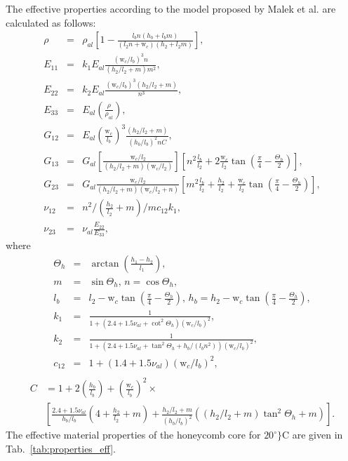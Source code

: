 The effective properties according to the model proposed by Malek et al. \cite{malek2015effective} are calculated as follows:
\begin{eqnarray}
	\rho &=& \rho_{al}\left[1-\frac{l_bn\left(h_b+l_bm\right)}{\left(l_2n+\mathrm{w}_c\right)\left(h_2+l_2m\right)}\right],\\
	E_{11} &=& k_1E_{al}\frac{(\mathrm{w}_c/l_b)^3n}{\left(h_2/l_2+m\right)m^2},\\
	E_{22} &=& k_2E_{al}\frac{(\mathrm{w}_c/l_b)^3(h_2/l_2+m)}{n^3},\\
	E_{33} &=& E_{al}\left(\frac{\rho}{\rho_{al}}\right),\\
	G_{12} &=& E_{al}\left(\frac{\mathrm{w}_c}{l_b}\right)^3\frac{(h_2/l_2+m)}{(h_b/l_b)^2nC},\\
	G_{13} &=& G_{al}\left[\frac{\mathrm{w}_c/l_2}{(h_2/l_2+m)(\mathrm{w}_c/l_2)}\right]\left[n^2\frac{l_b}{l_2}+2\frac{\mathrm{w}_c}{l_2} \tan\left(\frac{\pi}{4}-\frac{\Theta_h}{2}\right)\right],\\
	G_{23} &=& G_{al}\frac{\mathrm{w}_c/l_2}{\left(h_2/l_2+m\right)(\mathrm{w}_c/l_2 + n)} \left[m^2\frac{l_b}{l_2}+\frac{h_2}{l_2}+\frac{\mathrm{w}_c}{l_2}\tan\left(\frac{\pi}{4}-\frac{\Theta_h}{2}\right)\right],\\
	\nu_{12} &=& n^2/(\frac{h_2}{l_2}+m)/mc_{12}k_1,\\
	\nu_{23} &=& \nu_{al}\frac{E_{22}}{E_{33}},
\end{eqnarray}
where
\begin{eqnarray}
	\Theta_h &=& \arctan\left(\frac{h_1-h_2}{l_1}\right),\\
	m &=& \sin\Theta_h,\, n = \cos\Theta_h,\\
	l_b &=& l_2 - \mathrm{w}_c\tan\left(\frac{\pi}{4}-\frac{\Theta_h}{2}\right),\,
	h_b = h_2 - \mathrm{w}_c\tan\left(\frac{\pi}{4}-\frac{\Theta_h}{2}\right),\\
	k_1 &=& \frac{1}{1+\left(2.4+1.5\nu_{al}+\cot^{2}\Theta_h\right)(\mathrm{w}_c/l_b)^2},\\
	k_2 &=& \frac{1}{1+(2.4+1.5\nu_{al}+\tan^2\Theta_h+h_b/(l_bn^2))(\mathrm{w}_c/l_b)^2},\\
	c_{12} &=& 1+(1.4+1.5\nu_{al})(\mathrm{w}_c/l_b)^2,\\
\end{eqnarray}
\begin{equation}
	\begin{split}
	C &= 1+2\left(\frac{h_b}{l_b}\right)+\left(\frac{\mathrm{w}_c}{l_b}\right)^2\times\\
	&\left[\frac{2.4+1.5\nu_{al}}{h_b/l_b}\left(4+\frac{h_2}{l_2}+m\right)+\frac{h_2/l_2+m}{\left(h_b/l_b\right)^2}\left(\left(h_2/l_2+m\right)\tan^2\Theta_h+m\right)\right].
	\end{split}
\end{equation}
The effective material properties of the honeycomb core for \(20^{\circ}\}\)C are given in Tab.~\ref{tab:properties_eff}.
\vspace{-12pt}
